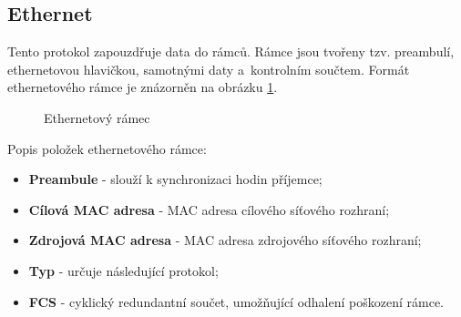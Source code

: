 \subsection{Ethernet}
Tento protokol zapouzdřuje data do rámců. Rámce jsou tvořeny tzv. preambulí, ethernetovou hlavičkou, samotnými daty a~kontrolním součtem. Formát ethernetového rámce je znázorněn na obrázku \ref{img:hlavika_ethernet}.

\begin{figure}[H]
    \centering
    \caption{Ethernetový rámec}
    \label{img:hlavika_ethernet}
\end{figure}

Popis položek ethernetového rámce:

\begin{itemize}
    \item \textbf{Preambule} - slouží k synchronizaci hodin příjemce;
    \item \textbf{Cílová MAC adresa} - MAC adresa cílového síťového rozhraní;
    \item \textbf{Zdrojová MAC adresa} - MAC adresa zdrojového síťového rozhraní;
    \item \textbf{Typ} - určuje následující protokol;
    \item \textbf{FCS} - cyklický redundantní součet, umožňující odhalení poškození rámce.
\end{itemize}

